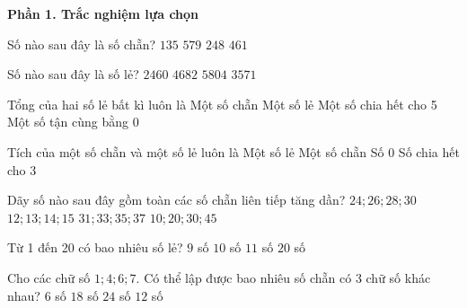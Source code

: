 \textbf{Phần 1. Trắc nghiệm lựa chọn}

\begin{ex} %
Số nào sau đây là số chẵn?
\choice
{$135$}
{$579$}
{\True $248$}
{$461$}
\end{ex}

\begin{ex} %
Số nào sau đây là số lẻ?
\choice
{$2460$}
{$4682$}
{$5804$}
{\True $3571$}
\end{ex}

\begin{ex} %
Tổng của hai số lẻ bất kì luôn là
\choice
{\True Một số chẵn}
{Một số lẻ}
{Một số chia hết cho 5}
{Một số tận cùng bằng 0}
\end{ex}

\begin{ex} %
Tích của một số chẵn và một số lẻ luôn là
\choice
{Một số lẻ}
{\True Một số chẵn}
{Số 0}
{Số chia hết cho 3}
\end{ex}

\begin{ex} %
Dãy số nào sau đây gồm toàn các số chẵn liên tiếp tăng dần?
\choice
{\True $24; 26; 28; 30$}
{$12; 13; 14; 15$}
{$31; 33; 35; 37$}
{$10; 20; 30; 45$}
\end{ex}

\begin{ex} %
Từ 1 đến 20 có bao nhiêu số lẻ?
\choice
{$9$ số}
{\True $10$ số}
{$11$ số}
{$20$ số}
\end{ex}

\begin{ex} %
Cho các chữ số $1; 4; 6; 7$. Có thể lập được bao nhiêu số chẵn có 3 chữ số khác nhau?
\choice
{$6$ số}
{$18$ số}
{$24$ số}
{\True $12$ số}
\end{ex}

